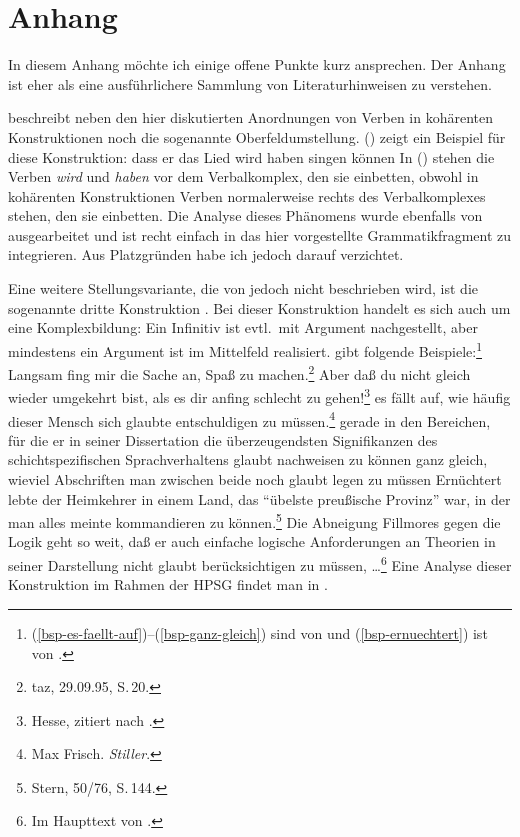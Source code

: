 {\section{Anhang}

In diesem Anhang möchte ich einige offene Punkte kurz ansprechen. Der Anhang ist eher als eine
ausführlichere Sammlung von Literaturhinweisen zu verstehen. 

\citet{Bech55a} beschreibt neben den hier diskutierten Anordnungen von Verben in kohärenten Konstruktionen noch die sogenannte
Oberfeldumstellung. () zeigt ein Beispiel für diese Konstruktion:
\ea
dass er das Lied wird haben singen können
\z
In () stehen die Verben \emph{wird} und \emph{haben} vor dem Verbalkomplex, den
sie einbetten, obwohl in kohärenten Konstruktionen Verben normalerweise rechts des Verbalkomplexes
stehen, den sie einbetten. Die Analyse dieses Phänomens wurde ebenfalls von
\citet{HN89b,HN94a} ausgearbeitet und ist recht einfach in das hier vorgestellte Grammatikfragment zu
integrieren. Aus Platzgründen habe ich jedoch darauf verzichtet. %

Eine weitere Stellungsvariante, die von \citet{Bech55a} jedoch nicht beschrieben wird, ist die sogenannte
dritte Konstruktion \citep*{dBR89}. Bei dieser Konstruktion handelt es sich
auch um eine Komplexbildung: Ein Infinitiv ist evtl.\ mit Argument nachgestellt, aber mindestens ein Argument
ist im Mittelfeld realisiert. \citet[344--345]{Mueller99a} gibt folgende Beispiele:\footnote{%
(\ref{bsp-es-faellt-auf})--(\ref{bsp-ganz-gleich}) sind von \citet[86]{vdVelde77}
und (\ref{bsp-ernuechtert}) ist von \citet[155]{Kvam80}.}
\eal
\ex Langsam fing mir die Sache an, Spaß zu machen.\footnote{
	taz, 29.09.95, S.\,20.
	}
\ex Aber daß du nicht gleich wieder umgekehrt bist, als es dir anfing schlecht zu gehen!\footnote{
        Hesse, zitiert nach \citep[112]{Bech55a}.
}
\ex es fällt auf, wie häufig dieser Mensch sich glaubte entschuldigen zu müssen.\footnote{
        Max Frisch. \emph{Stiller}.
      }\label{bsp-es-faellt-auf}
\ex gerade in den Bereichen, für die er in seiner Dissertation die überzeugendsten Signifikanzen
        des schichtspezifischen Sprachverhaltens glaubt nachweisen zu können
\ex ganz gleich, wieviel Abschriften man zwischen beide noch glaubt legen
        zu müssen\label{bsp-ganz-gleich}
\ex Ernüchtert lebte der Heimkehrer in einem Land, das "`übelste preußische
      Provinz"' war, in der man alles meinte kommandieren zu können.\footnote{
        Stern, 50/76, S.\,144.
      }\label{bsp-ernuechtert}
\ex Die Abneigung Fillmores gegen die Logik geht so weit, daß er auch einfache
      logische Anforderungen an Theorien in seiner Darstellung nicht glaubt berücksichtigen
      zu müssen, \ldots\footnote{
        Im Haupttext von \citep[48]{Heringer73a}.
      }
\zl
Eine Analyse dieser Konstruktion im
Rahmen der HPSG findet man in .

}
